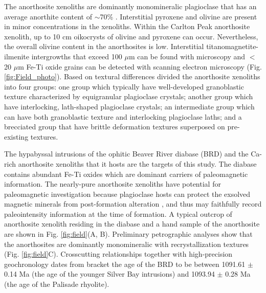 \documentclass[draft]{agujournal2019}
\begin{document}
The anorthosite xenoliths are dominantly monomineralic plagioclase that has an average anorthite content of $\sim$70\% \cite{Morrison1983a, Doyle2016a}. Interstitial pyroxene and olivine are present in minor concentrations in the xenoliths. Within the Carlton Peak anorthosite xenolith, up to 10 cm oikocrysts of olivine and pyroxene can occur. Nevertheless, the overall olivine content in the anorthosites is low. Interstitial titanomagnetite-ilmenite intergrowths that exceed 100 $\mu$m can be found with microscopy and $<$20 $\mu$m Fe-Ti oxide grains can be detected with scanning electron microscopy (Fig. \ref{fig:Field_photo}). Based on textural differences  divided the anorthosite xenoliths into four groups: one group which typically have well-developed granoblastic texture characterized by equigranular plagioclase crystals; another group which have interlocking, lath-shaped plagioclase crystals; an intermediate group which can have both granoblastic texture and interlocking plagioclase laths; and a brecciated group that have brittle deformation textures superposed on pre-existing textures. 

The hypabyssal intrusions of the ophitic Beaver River diabase (BRD) and the Ca-rich anorthosite xenoliths that it hosts are the targets of this study. The diabase contains abundant Fe-Ti oxides which are dominant carriers of paleomagnetic information. The nearly-pure anorthosite xenoliths have potential for paleomagnetic investigation because plagioclase hosts can protect the exsolved magnetic minerals from post-formation alteration \citep{Tarduno2005a}, and thus may faithfully record paleointensity information at the time of formation. A typical outcrop of anorthosite xenolith residing in the diabase and a hand sample of the anorthosite are shown in Fig. \ref{fig:field}(A, B). Preliminary petrographic analyses show that the anorthosites are dominantly monomineralic with recrystallization textures (Fig. \ref{fig:field}C). Crosscutting relationships together with high-precision geochronology dates from \cite{Swanson-Hysell2019a} bracket the age of the BRD to be between 1091.61 $\pm$ 0.14 Ma  (the age of the younger Silver Bay intrusions) and 1093.94 $\pm$ 0.28 Ma  (the age of the Palisade rhyolite). 
\end{document}
